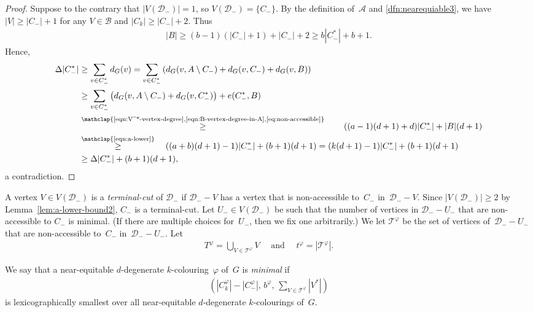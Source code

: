 \documentclass[11pt]{article}
\theoremstyle{plain}
\numberwithin{equation}{section}
\begin{document}
\begin{proof}
Suppose to the contrary that $|V(\mathcal{D}_-)| = 1$, so $ V(\mathcal{D}_-) = \{C_-\}$.
By the definition of~$\mathcal{A}$ and \ref{dfn:nearequiable3}, we have $|V|\ge |C_-|+1$ for any $V\in \mathcal{B}$ and $|C_k| \ge |C_-|+2$.
Thus
\begin{align}
\label{eqn:a-lower}
|B| \ge (b-1)( |C_-| +1)+ |C_-| +2 \ge b |C_-^*|+b+1.
\end{align}
Hence,
 		\begin{align*}
 			\Delta |C_-^*|  &
			\ge  \sum_{v\in C_-^*} d_G(v)  = \sum_{v\in C_-^*} \left( d_G(v,A \setminus C_-) + d_G(v,C_-) + d_G(v,B) \right)\\
			& \ge \sum_{v\in C_-^*} \left( d_G(v,A \setminus C_-) + d_G(v,C_-^*) \right) + e(C_-^*,B)\\
			& \overset{\mathclap{\text{\eqref{eqn:V^*-vertex-degree},\eqref{eqn:B-vertex-degree-in-A},\eqref{eq:non-accessible}}}}\ge
			\quad	\quad ((a-1)(d+1)+d) |C_-^*| +|B|(d+1)\\
 			& \overset{\mathclap{\text{\eqref{eqn:a-lower}}}} \ge  \quad ((a+b)(d+1)-1) |C_-^*| +(b+1)(d+1)
 			= (k(d+1)-1) |C_-^*|+(b+1)(d+1) \\
			 &\ge \Delta |C_-^*| + (b+1)(d+1),
 		\end{align*}
a contradiction.
 \end{proof}


A vertex $V\in V(\mathcal{D}_-)$ is a \emph{terminal-cut} of $\mathcal{D}_-$ if $\mathcal{D}_--V$ has a vertex that is non-accessible to~$C_-$ in~$\mathcal{D}_--V$.
Since $|V(\mathcal{D}_-)| \ge 2$ by Lemma~\ref{lem:a-lower-bound2}, $C_-$ is a terminal-cut.
Let $U_- \in V(\mathcal{D}_-)$ be such that the number of vertices in $\mathcal{D}_- -U_-$ that are non-accessible to $C_-$ is minimal.
(If there are multiple choices for~$U_-$, then  we fix one arbitrarily.)
We let $\mathcal{T}^\varphi$ be the set of vertices of~$\mathcal{D}_- -U_-$  that are
non-accessible to~$C_-$ in~$\mathcal{D}_- -U_-$.
Let
\begin{align*}
T^\varphi=\bigcup_{V\in \mathcal{T}^\varphi} V\quad
 \text{ and }\quad
 t^\varphi=|\mathcal{T}^\varphi|.
\end{align*}


We say that a near-equitable $d$-degenerate $k$-colouring~$\varphi$ of~$G$ is \emph{minimal} if
\begin{align*}
	( |C_k^\varphi|-|C_-^\varphi|,\, b^\varphi,\,   \sum\limits_{V\in \mathcal{T}^\varphi} |V^*|)
\end{align*}
is  lexicographically smallest over all near-equitable $d$-degenerate $k$-colourings of~$G$.
\end{document}
